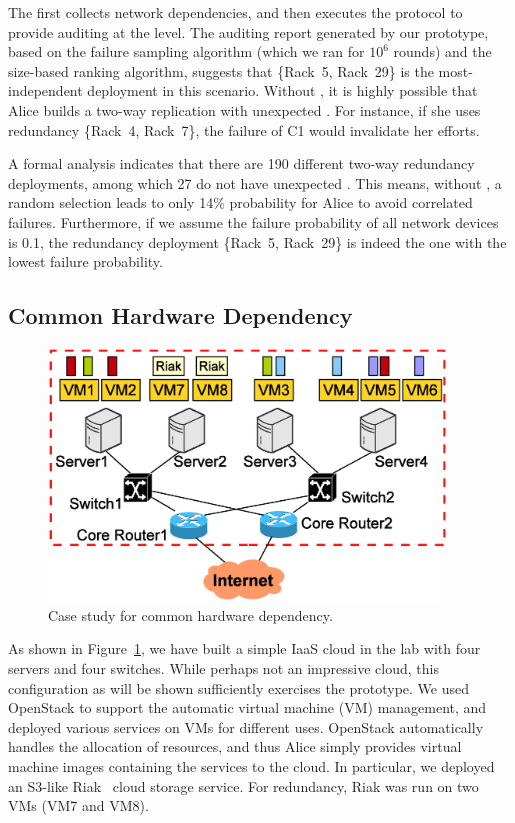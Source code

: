 The \app first collects network dependencies, and then
executes the \sia protocol to provide auditing at the \ft level.
The auditing report generated by our prototype, based on the
failure sampling algorithm (which we ran for $10^6$ rounds)
and the size-based ranking algorithm,
suggests that
\{Rack~5, Rack~29\} is the most-independent deployment in this scenario.
Without \app, it is highly possible that Alice
builds a two-way replication with unexpected \rgs.
For instance, if she uses redundancy \{Rack~4, Rack~7\},
the failure of C1 would invalidate her efforts.

A formal analysis indicates that
there are 190 different two-way redundancy deployments, among which 27
do not have unexpected \rgs.
This means, without \app, a random selection leads to only 14\% probability
for Alice to avoid correlated failures.
Furthermore, if we assume the failure probability of all
network devices is 0.1, the redundancy deployment
\{Rack~5, Rack~29\} is indeed the one
with the lowest failure probability.


\subsection{Common Hardware Dependency}
\label{subsec-case2}

\begin{figure}[tb] \centering
\includegraphics[width=0.94\textwidth]{figs/campus.eps}
\caption{Case study for common hardware dependency.}
\label{fig-case2}
\end{figure}

As shown in Figure~\ref{fig-case2},
we have built a simple IaaS cloud in the lab with four servers
and four switches.
While perhaps not an impressive cloud,
this configuration as will be shown
sufficiently exercises the \app prototype.
We used OpenStack to support the automatic virtual machine (VM) management,
and deployed various services on VMs for different uses.
OpenStack automatically handles the allocation of resources,
and thus Alice simply provides virtual machine images
containing the services to the cloud.
In particular, we deployed an S3-like Riak~\cite{Riak}
cloud storage service.
For redundancy, Riak was run on two VMs (VM7 and VM8).

